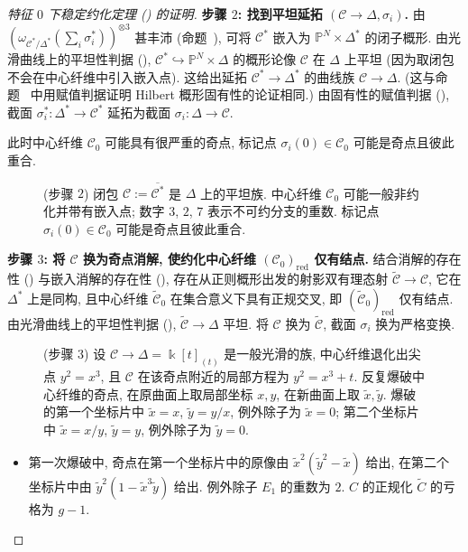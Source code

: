 \begin{proof}[特征 $0$ 下稳定约化定理 () 的证明]
\textbf{步骤 $2$: 找到平坦延拓 $(\mathcal C\to\Delta,\allowbreak \sigma_i)$.}
由 $(\omega_{\mathcal C^*/\Delta^*}(\sum_i\sigma_i^*))^{\otimes3}$ 甚丰沛 (命题~), 可将 $\mathcal C^*$ 嵌入为 $\mathbb P^N\times\Delta^*$ 的闭子概形. 由光滑曲线上的平坦性判据 (), $\mathcal C^*\hookrightarrow\mathbb P^N\times\Delta$ 的概形论像 $\mathcal C$ 在 $\Delta$ 上平坦 (因为取闭包不会在中心纤维中引入嵌入点). 这给出延拓 $\mathcal C^*\to\Delta^*$ 的曲线族 $\mathcal C\to\Delta$. (这与命题~ 中用赋值判据证明 Hilbert 概形固有性的论证相同.) 由固有性的赋值判据 (), 截面 $\sigma_i^*: \Delta^*\to\mathcal C^*$ 延拓为截面 $\sigma_i:\Delta\to\mathcal C$.

此时中心纤维 $\mathcal C_0$ 可能具有很严重的奇点, 标记点 $\sigma_i(0)\in\mathcal C_0$ 可能是奇点且彼此重合.
\begin{figure}[H]\centering{}
\caption{(步骤 $2$) 闭包 $\mathcal C:=\overline{\mathcal C^*}$ 是 $\Delta$ 上的平坦族. 中心纤维 $\mathcal C_0$ 可能一般非约化并带有嵌入点; 数字 $3$, $2$, $7$ 表示不可约分支的重数. 标记点 $\sigma_i(0)\in\mathcal C_0$ 可能是奇点且彼此重合.}\label{src:6.5.4}
\end{figure}
\textbf{步骤 $3$: 将 $\mathcal C$ 换为奇点消解, 使约化中心纤维 $(\mathcal C_0)_{\mathrm{red}}$ 仅有结点.}
结合消解的存在性 () 与嵌入消解的存在性 (), 存在从正则概形出发的射影双有理态射 $\widetilde{\mathcal C}\to\mathcal C$, 它在 $\Delta^*$ 上是同构, 且中心纤维 $\widetilde{\mathcal C}_0$ 在集合意义下具有正规交叉, 即 $(\widetilde{\mathcal C}_0)_{\mathrm{red}}$ 仅有结点. 由光滑曲线上的平坦性判据 (), $\widetilde{\mathcal C}\to\Delta$ 平坦. 将 $\mathcal C$ 换为 $\widetilde{\mathcal C}$, 截面 $\sigma_i$ 换为严格变换.
\begin{figure}[H]\centering
\caption{(步骤 $3$) 设 $\mathcal C\to\Delta=\Bbbk[t]_{(t)}$ 是一般光滑的族, 中心纤维退化出尖点 $y^2=x^3$, 且 $\mathcal C$ 在该奇点附近的局部方程为 $y^2=x^3+t$. 反复爆破中心纤维的奇点, 在原曲面上取局部坐标 $x,\allowbreak y$, 在新曲面上取 $\widetilde x,\allowbreak \widetilde y$. 爆破的第一个坐标片中 $\widetilde x=x$, $\widetilde y=y/x$, 例外除子为 $\widetilde x=0$; 第二个坐标片中 $\widetilde x=x/y$, $\widetilde y=y$, 例外除子为 $\widetilde y=0$.}\label{src:6.5.5}
\end{figure}
\begin{itemize}
\item 第一次爆破中, 奇点在第一个坐标片中的原像由 $\widetilde x^2(\widetilde y^2-\widetilde x)$ 给出, 在第二个坐标片中由 $\widetilde y^2(1-\widetilde x^3\widetilde y)$ 给出. 例外除子 $E_1$ 的重数为 $2$. $C$ 的正规化 $\widetilde C$ 的亏格为 $g-1$.

\end{itemize}
\end{proof}
